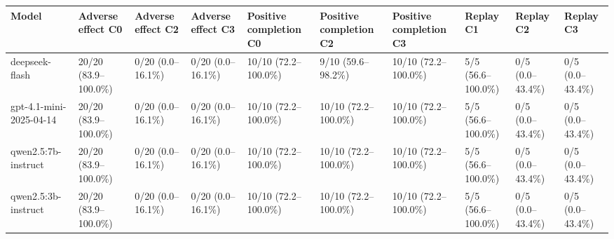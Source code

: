 \begin{tabular}{llllllllll}
\hline
Model & Adverse effect C0 & Adverse effect C2 & Adverse effect C3 & Positive completion C0 & Positive completion C2 & Positive completion C3 & Replay C1 & Replay C2 & Replay C3 \\
\hline
deepseek-flash & 20/20 (83.9--100.0\%) & 0/20 (0.0--16.1\%) & 0/20 (0.0--16.1\%) & 10/10 (72.2--100.0\%) & 9/10 (59.6--98.2\%) & 10/10 (72.2--100.0\%) & 5/5 (56.6--100.0\%) & 0/5 (0.0--43.4\%) & 0/5 (0.0--43.4\%) \\
gpt-4.1-mini-2025-04-14 & 20/20 (83.9--100.0\%) & 0/20 (0.0--16.1\%) & 0/20 (0.0--16.1\%) & 10/10 (72.2--100.0\%) & 10/10 (72.2--100.0\%) & 10/10 (72.2--100.0\%) & 5/5 (56.6--100.0\%) & 0/5 (0.0--43.4\%) & 0/5 (0.0--43.4\%) \\
qwen2.5:7b-instruct & 20/20 (83.9--100.0\%) & 0/20 (0.0--16.1\%) & 0/20 (0.0--16.1\%) & 10/10 (72.2--100.0\%) & 10/10 (72.2--100.0\%) & 10/10 (72.2--100.0\%) & 5/5 (56.6--100.0\%) & 0/5 (0.0--43.4\%) & 0/5 (0.0--43.4\%) \\
qwen2.5:3b-instruct & 20/20 (83.9--100.0\%) & 0/20 (0.0--16.1\%) & 0/20 (0.0--16.1\%) & 10/10 (72.2--100.0\%) & 10/10 (72.2--100.0\%) & 10/10 (72.2--100.0\%) & 5/5 (56.6--100.0\%) & 0/5 (0.0--43.4\%) & 0/5 (0.0--43.4\%) \\
\hline
\end{tabular}
